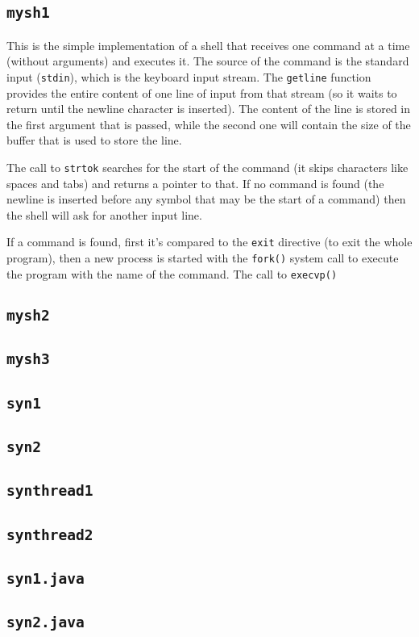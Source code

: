 \subsection{\texttt{mysh1}}
This is the simple implementation of a shell that receives one command at a time (without arguments) and executes it. The source of the command is the standard input (\texttt{stdin}), which is the keyboard input stream. The \texttt{getline} function provides the entire content of one line of input from that stream (so it waits to return until the newline character is inserted). The content of the line is stored in the first argument that is passed, while the second one will contain the size of the buffer that is used to store the line. \newline

The call to \texttt{strtok} searches for the start of the command (it skips characters like spaces and tabs) and returns a pointer to that. If no command is found (the newline is inserted before any symbol that may be the start of a command) then the shell will ask for another input line. \newline

If a command is found, first it's compared to the \texttt{exit} directive (to exit the whole program), then a new process is started with the \texttt{fork()} system call to execute the program with the name of the command. The call to \texttt{execvp()} 

\subsection{\texttt{mysh2}}
\subsection{\texttt{mysh3}}
\subsection{\texttt{syn1}}
\subsection{\texttt{syn2}}
\subsection{\texttt{synthread1}}
\subsection{\texttt{synthread2}}
\subsection{\texttt{syn1.java}}
\subsection{\texttt{syn2.java}}


\clearpage



